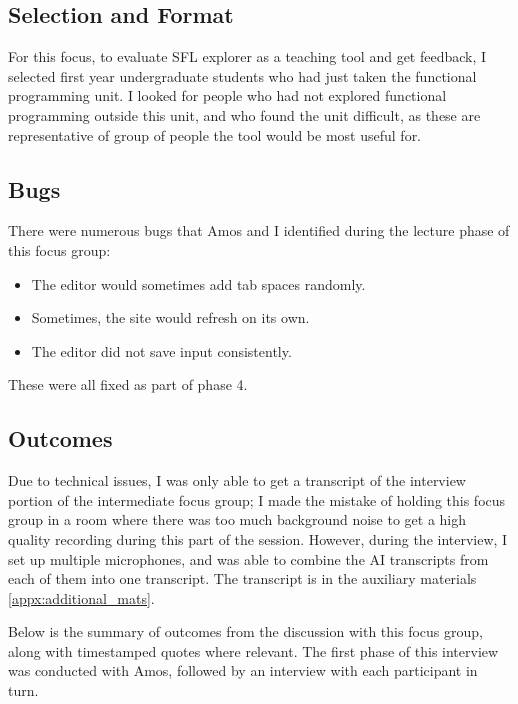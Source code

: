 \subsection{Selection and Format}
For this focus, to evaluate SFL explorer as a teaching tool and get feedback, I selected first year undergraduate students who had just taken the functional programming unit. I looked for people who had not explored functional programming outside this unit, and who found the unit difficult, as these are representative of group of people the tool would be most useful for. 

\subsection{Bugs}
There were numerous bugs that Amos and I identified during the lecture phase of this focus group:
\begin{itemize}
    \item The editor would sometimes add tab spaces randomly.
    \item Sometimes, the site would refresh on its own.
    \item The editor did not save input consistently.
\end{itemize}
\noindent These were all fixed as part of phase 4.

\subsection{Outcomes}
Due to technical issues, I was only able to get a transcript of the interview portion of the intermediate focus group; I made the mistake of holding this focus group in a room where there was too much background noise to get a high quality recording during this part of the session. However, during the interview, I set up multiple microphones, and was able to combine the AI transcripts from each of them into one transcript. The transcript is in the auxiliary materials \ref{appx:additional_mats}. 

Below is the summary of outcomes from the discussion with this focus group, along with timestamped quotes where relevant. The first phase of this interview was conducted with Amos, followed by an interview with each participant in turn. 


